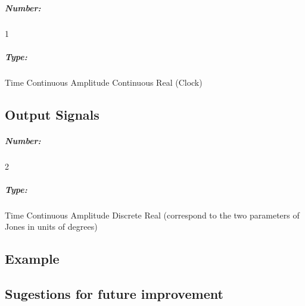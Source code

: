 \subparagraph*{Number:} 1

\subparagraph*{Type:} Time Continuous Amplitude Continuous Real (Clock)

\subsection*{Output Signals}

\subparagraph*{Number:} 2

\subparagraph*{Type:} Time Continuous Amplitude Discrete Real (correspond to the two parameters of Jones in units of degrees)

\subsection*{Example}

\subsection*{Sugestions for future improvement}
